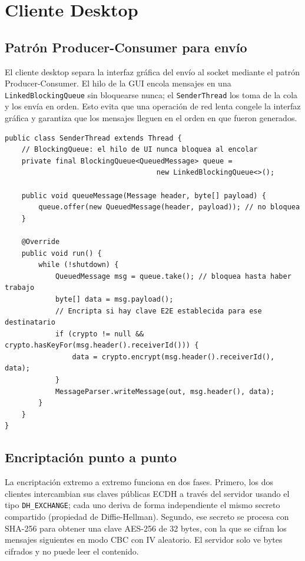 \documentclass[12pt,a4paper]{article}
\begin{document}
\section{Cliente Desktop}

\subsection{Patrón Producer-Consumer para envío}

El cliente desktop separa la interfaz gráfica del envío al socket mediante
el patrón Producer-Consumer. El hilo de la GUI encola mensajes en una
\texttt{LinkedBlockingQueue} sin bloquearse nunca; el \texttt{SenderThread}
los toma de la cola y los envía en orden. Esto evita que una operación de red
lenta congele la interfaz gráfica y garantiza que los mensajes lleguen en el
orden en que fueron generados.

\begin{lstlisting}[style=java, caption={SenderThread.java --- cola de mensajes thread-safe}]
public class SenderThread extends Thread {
    // BlockingQueue: el hilo de UI nunca bloquea al encolar
    private final BlockingQueue<QueuedMessage> queue =
                                    new LinkedBlockingQueue<>();

    public void queueMessage(Message header, byte[] payload) {
        queue.offer(new QueuedMessage(header, payload)); // no bloquea
    }

    @Override
    public void run() {
        while (!shutdown) {
            QueuedMessage msg = queue.take(); // bloquea hasta haber trabajo
            byte[] data = msg.payload();
            // Encripta si hay clave E2E establecida para ese destinatario
            if (crypto != null && crypto.hasKeyFor(msg.header().receiverId())) {
                data = crypto.encrypt(msg.header().receiverId(), data);
            }
            MessageParser.writeMessage(out, msg.header(), data);
        }
    }
}
\end{lstlisting}

\subsection{Encriptación punto a punto}

La encriptación extremo a extremo funciona en dos fases. Primero, los dos
clientes intercambian sus claves públicas ECDH a través del servidor usando
el tipo \texttt{DH\_EXCHANGE}; cada uno deriva de forma independiente el mismo
secreto compartido (propiedad de Diffie-Hellman). Segundo, ese secreto se
procesa con SHA-256 para obtener una clave AES-256 de 32 bytes, con la que se
cifran los mensajes siguientes en modo CBC con IV aleatorio. El servidor solo
ve bytes cifrados y no puede leer el contenido.
\end{document}
